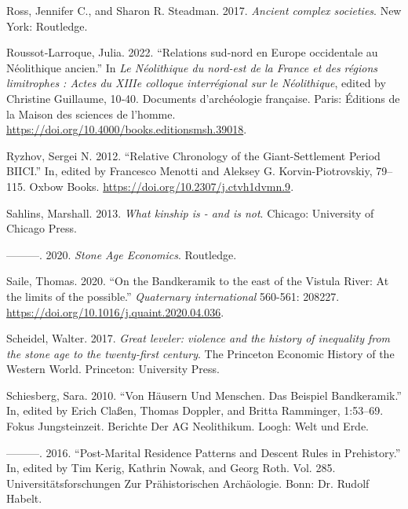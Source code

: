\documentclass[
  12pt,
  a4paper, twoside]{book}
\newlength{\cslhangindent}
\newlength{\cslentryspacingunit} %
\newenvironment{CSLReferences}[2] %
 {%
  \setlength{\parindent}{0pt}
  \ifodd #1
  \let\oldpar\par
  \def\par{\hangindent=\cslhangindent\oldpar}
  \fi
  \setlength{\parskip}{#2\cslentryspacingunit}
 }%
 {}
\begin{document}
\begin{CSLReferences}{1}{0}
\leavevmode{}%
Ross, Jennifer C., and Sharon R. Steadman. 2017. \emph{Ancient complex societies}. New York: Routledge.

\leavevmode{}%
Roussot‑Larroque, Julia. 2022. {``Relations sud‑nord en Europe occidentale au Néolithique ancien.''} In \emph{Le Néolithique du nord-est de la France et des régions limitrophes : Actes du XIIIe colloque interrégional sur le Néolithique}, edited by Christine Guillaume, 10‑40. Documents d'archéologie française. {Paris}: {Éditions de la Maison des sciences de l'homme}. \url{https://doi.org/10.4000/books.editionsmsh.39018}.

\leavevmode{}%
Ryzhov, Sergei N. 2012. {``Relative Chronology of the Giant-Settlement Period BII{\textendash}CI.''} In, edited by Francesco Menotti and Aleksey G. Korvin-Piotrovskiy, 79--115. Oxbow Books. \url{https://doi.org/10.2307/j.ctvh1dvmn.9}.

\leavevmode{}%
Sahlins, Marshall. 2013. \emph{What kinship is - and is not}. Chicago: University of Chicago Press.

\leavevmode{}%
---------. 2020. \emph{Stone Age Economics}. Routledge.

\leavevmode{}%
Saile, Thomas. 2020. {``On the Bandkeramik to the east of the Vistula River: At the limits of the possible.''} \emph{Quaternary international} 560-561: 208227. \url{https://doi.org/10.1016/j.quaint.2020.04.036}.

\leavevmode{}%
Scheidel, Walter. 2017. \emph{Great leveler: violence and the history of inequality from the stone age to the twenty-first century}. The Princeton Economic History of the Western World. Princeton: University Press.

\leavevmode{}%
Schiesberg, Sara. 2010. {``Von Häusern Und Menschen. Das Beispiel Bandkeramik.''} In, edited by Erich Claßen, Thomas Doppler, and Britta Ramminger, 1:53--69. Fokus Jungsteinzeit. Berichte Der AG Neolithikum. Loogh: Welt und Erde.

\leavevmode{}%
---------. 2016. {``Post-Marital Residence Patterns and Descent Rules in Prehistory.''} In, edited by Tim Kerig, Kathrin Nowak, and Georg Roth. Vol. 285. Universitätsforschungen Zur Prähistorischen Archäologie. Bonn: Dr. Rudolf Habelt.


\end{CSLReferences}
\end{document}

